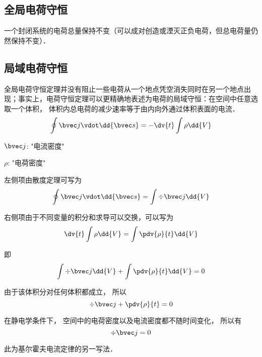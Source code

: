 
\subsection{全局电荷守恒}
一个封闭系统的电荷总量保持不变\cite{GriffE}（可以成对创造或湮灭正负电荷，但总电荷量仍然保持不变）．

\subsection{局域电荷守恒}
全局电荷守恒定理并没有阻止一些电荷从一个地点凭空消失同时在另一个地点出现；事实上，电荷守恒定理可以更精确地表述为电荷的局域守恒：在空间中任意选取一个体积， 体积内总电荷的减少速率等于由内向外通过体积表面的电流．\cite{GriffE}
\begin{equation}
\oint \bvec j \vdot \dd{\bvec s}  =  - \dv{t} \int \rho \dd{V}
\end{equation} 

$\bvec j$: "电流密度"

$\rho$: "电荷密度"

左侧项由散度定理可写为
\begin{equation}
\oint \bvec j \vdot \dd{\bvec s}  =\int \div \bvec j \dd{V}
\end{equation} 

右侧项由于不同变量的积分和求导可以交换，可以写为%
\begin{equation}
\dv{t} \int \rho  \dd{V}  = \int \pdv{\rho}{t} \dd{V}
\end{equation}

即
\begin{equation}
\int \div \bvec j \dd{V} + \int \pdv{\rho}{t} \dd{V} = 0
\end{equation} 

由于该体积分对任何体积都成立， 所以
\begin{equation}\label{ChgCsv_eq4}
\div \bvec j + \pdv{\rho}{t} = 0
\end{equation}

在静电学条件下， 空间中的电荷密度以及电流密度都不随时间变化， 所以有
\begin{equation}
\div \bvec j = 0
\end{equation}

此为基尔霍夫电流定律的另一写法．
